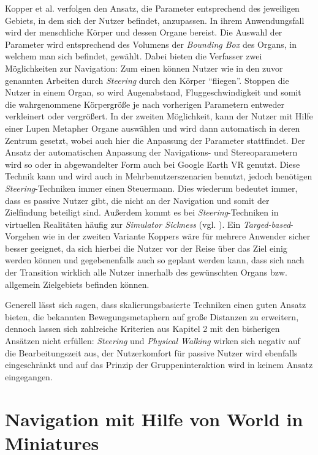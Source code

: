 Kopper et al. \cite{Kopper2006DesignEnvironments} verfolgen den Ansatz, die Parameter entsprechend des jeweiligen Gebiets, in dem sich der Nutzer befindet, anzupassen. In ihrem Anwendungsfall wird der menschliche Körper und dessen Organe bereist. Die Auswahl der Parameter wird entsprechend des Volumens der \textit{Bounding Box} des Organs, in welchem man sich befindet, gewählt. Dabei bieten die Verfasser zwei Möglichkeiten zur Navigation: Zum einen können Nutzer wie in den zuvor genannten Arbeiten durch \textit{Steering} durch den Körper “fliegen”. Stoppen die Nutzer in einem Organ, so wird Augenabstand, Fluggeschwindigkeit und somit die wahrgenommene Körpergröße je nach vorherigen Parametern entweder verkleinert oder vergrößert. In der zweiten Möglichkeit, kann der Nutzer mit Hilfe einer Lupen Metapher Organe auswählen und wird dann automatisch in deren Zentrum gesetzt, wobei auch hier die Anpassung der Parameter stattfindet.
Der Ansatz der automatischen Anpassung der Navigations- und Stereoparametern wird so oder in abgewandelter Form auch bei Google Earth VR genutzt. Diese Technik kann und wird auch in Mehrbenutzerszenarien benutzt, jedoch benötigen \textit{Steering}-Techniken immer einen Steuermann. Dies wiederum bedeutet immer, dass es passive Nutzer gibt, die nicht an der Navigation und somit der Zielfindung beteiligt sind. Außerdem kommt es bei \textit{Steering}-Techniken in virtuellen Realitäten häufig zur \textit{Simulator Sickness} (vgl. \cite{Lackner2014MotionVomiting}).
Ein \textit{Targed-based}-Vorgehen wie in der zweiten Variante Koppers wäre für mehrere Anwender sicher besser geeignet, da sich hierbei die Nutzer vor der Reise über das Ziel einig werden können und gegebenenfalls auch so geplant werden kann, dass sich nach der Transition wirklich alle Nutzer innerhalb des gewünschten Organs bzw. allgemein Zielgebiets befinden können.

Generell lässt sich sagen, dass skalierungsbasierte Techniken einen guten Ansatz bieten, die bekannten Bewegungsmetaphern auf große Distanzen zu erweitern, dennoch lassen sich zahlreiche Kriterien aus Kapitel 2 mit den bisherigen Ansätzen nicht erfüllen:
\textit{Steering} und \textit{Physical Walking} wirken sich negativ auf die Bearbeitungszeit aus, der Nutzerkomfort für passive Nutzer wird ebenfalls eingeschränkt und auf das Prinzip der Gruppeninteraktion wird in keinem Ansatz eingegangen.

\section{Navigation mit Hilfe von World in Miniatures}

